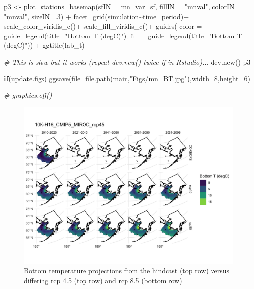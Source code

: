 \documentclass[
]{article}
\newenvironment{Shaded}{\begin{snugshade}}{\end{snugshade}}
\newcommand{\AttributeTok}[1]{\textcolor[rgb]{0.77,0.63,0.00}{#1}}
\newcommand{\CommentTok}[1]{\textcolor[rgb]{0.56,0.35,0.01}{\textit{#1}}}
\newcommand{\ControlFlowTok}[1]{\textcolor[rgb]{0.13,0.29,0.53}{\textbf{#1}}}
\newcommand{\DecValTok}[1]{\textcolor[rgb]{0.00,0.00,0.81}{#1}}
\newcommand{\FunctionTok}[1]{\textcolor[rgb]{0.00,0.00,0.00}{#1}}
\newcommand{\NormalTok}[1]{#1}
\newcommand{\OtherTok}[1]{\textcolor[rgb]{0.56,0.35,0.01}{#1}}
\newcommand{\SpecialCharTok}[1]{\textcolor[rgb]{0.00,0.00,0.00}{#1}}
\newcommand{\StringTok}[1]{\textcolor[rgb]{0.31,0.60,0.02}{#1}}
\begin{document}
\begin{Shaded}
\begin{Highlighting}[]
\NormalTok{    p3         }\OtherTok{\textless{}{-}} \FunctionTok{plot\_stations\_basemap}\NormalTok{(}\AttributeTok{sfIN =}\NormalTok{ mn\_var\_sf,}
                                \AttributeTok{fillIN =} \StringTok{"mnval"}\NormalTok{,}
                                \AttributeTok{colorIN =} \StringTok{"mnval"}\NormalTok{,}
                                \AttributeTok{sizeIN=}\NormalTok{.}\DecValTok{3}\NormalTok{) }\SpecialCharTok{+}
      \FunctionTok{facet\_grid}\NormalTok{(simulation}\SpecialCharTok{\textasciitilde{}}\NormalTok{time\_period)}\SpecialCharTok{+}
      \FunctionTok{scale\_color\_viridis\_c}\NormalTok{()}\SpecialCharTok{+}
      \FunctionTok{scale\_fill\_viridis\_c}\NormalTok{()}\SpecialCharTok{+}
      \FunctionTok{guides}\NormalTok{(}
        \AttributeTok{color =}  \FunctionTok{guide\_legend}\NormalTok{(}\AttributeTok{title=}\StringTok{"Bottom T (degC)"}\NormalTok{),}
        \AttributeTok{fill  =}  \FunctionTok{guide\_legend}\NormalTok{(}\AttributeTok{title=}\StringTok{"Bottom T (degC)"}\NormalTok{)) }\SpecialCharTok{+}
      \FunctionTok{ggtitle}\NormalTok{(lab\_t)}
   
    \CommentTok{\# This is slow but it works (repeat dev.new() twice if in Rstudio)...}
    \FunctionTok{dev.new}\NormalTok{()}
\NormalTok{    p3}
    
    \ControlFlowTok{if}\NormalTok{(update.figs)  }
      \FunctionTok{ggsave}\NormalTok{(}\AttributeTok{file=}\FunctionTok{file.path}\NormalTok{(main,}\StringTok{"Figs/mn\_BT.jpg"}\NormalTok{),}\AttributeTok{width=}\DecValTok{8}\NormalTok{,}\AttributeTok{height=}\DecValTok{6}\NormalTok{)}
  
    \CommentTok{\# graphics.off()}
\end{Highlighting}
\end{Shaded}

\begin{figure}
\centering
\includegraphics{Figs/mn_BT.jpg}
\caption{Bottom temperature projections from the hindcast (top row)
versus differing rcp 4.5 (top row) and rcp 8.5 (bottom row)}
\end{figure}
\end{document}
